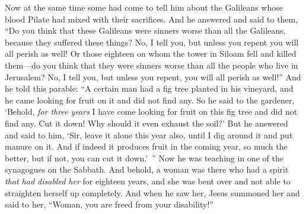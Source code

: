 \begin{biblechapter} %
 Now at the same time some had come to tell him about the Galileans whose blood Pilate had mixed with their sacrifices.
\verse And he answered and said to them, “Do you think that these Galileans were sinners worse than all the Galileans, because they suffered these things?
\verse No, I tell you, but unless you repent you will all perish as well!
\verse Or those eighteen on whom the tower in Siloam fell and killed them—do you think that they were sinners worse than all the people who live in Jerusalem?
\verse No, I tell you, but unless you repent, you will all perish as well!”
 And he told this parable: “A certain man had a fig tree planted in his vineyard, and he came looking for fruit on it and did not find any.
\verse So he said to the gardener, ‘Behold, \textit{for three years} I have come looking for fruit on this fig tree and did not find any. Cut it down! Why should it even exhaust the soil?’
\verse But he answered and said to him, ‘Sir, leave it alone this year also, until I dig around it and put manure on it.
\verse And if indeed it produces fruit in the coming year, so much the better, but if not, you can cut it down.’ ”
 Now he was teaching in one of the synagogues on the Sabbath.
\verse And behold, a woman was there who had a spirit \textit{that had disabled her} for eighteen years, and she was bent over and not able to straighten herself up completely.
\verse And when he saw her, Jesus summoned her and said to her, “Woman, you are freed from your disability!”

\end{biblechapter}
